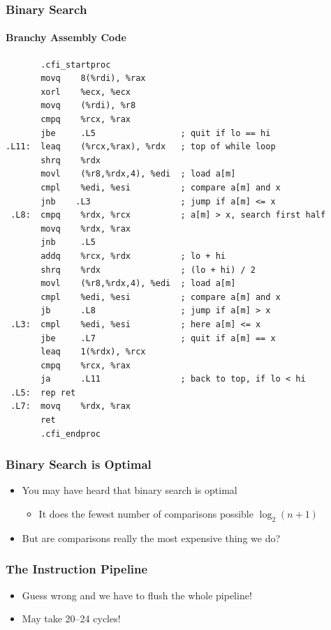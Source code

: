 \documentclass[xcolor=dvipsnames]{beamer}
\newcommand{\mi}[1]{\multiinclude[<+>][start=1,format=pdf]{#1}}
\begin{document}
\begin{frame}[fragile]
  \frametitle{Binary Search}
  \framesubtitle{Branchy Assembly Code}

\tiny
\begin{verbatim}
       .cfi_startproc
       movq    8(%rdi), %rax
       xorl    %ecx, %ecx
       movq    (%rdi), %r8
       cmpq    %rcx, %rax
       jbe     .L5                 ; quit if lo == hi
.L11:  leaq    (%rcx,%rax), %rdx   ; top of while loop
       shrq    %rdx
       movl    (%r8,%rdx,4), %edi  ; load a[m]
       cmpl    %edi, %esi          ; compare a[m] and x
       jnb    .L3                  ; jump if a[m] <= x
 .L8:  cmpq    %rdx, %rcx          ; a[m] > x, search first half
       movq    %rdx, %rax
       jnb     .L5
       addq    %rcx, %rdx          ; lo + hi
       shrq    %rdx                ; (lo + hi) / 2
       movl    (%r8,%rdx,4), %edi  ; load a[m]
       cmpl    %edi, %esi          ; compare a[m] and x
       jb      .L8                 ; jump if a[m] > x
 .L3:  cmpl    %edi, %esi          ; here a[m] <= x
       jbe     .L7                 ; quit if a[m] == x
       leaq    1(%rdx), %rcx
       cmpq    %rcx, %rax
       ja      .L11                ; back to top, if lo < hi
 .L5:  rep ret
 .L7:  movq    %rdx, %rax
       ret
       .cfi_endproc
\end{verbatim}

\end{frame}

\begin{frame}
   \frametitle{Binary Search is Optimal}

   \begin{itemize}[<+->]
     \item You may have heard that binary search is optimal
     \begin{itemize}
        \item It does the fewest number of comparisons possible $\log_2(n+1)$
     \end{itemize}
     \item But are comparisons really the most expensive thing we do?
   \end{itemize}
\end{frame}

\begin{frame}
   \frametitle{The Instruction Pipeline}

   \begin{center}
      \mi{figs/pipeline}
   \end{center}
   \vspace{-1em}
   \begin{itemize}
     \item<3->Guess wrong and we have to flush the whole pipeline!
     \item<4->May take 20--24 cycles!
   \end{itemize}
\end{frame}
\end{document}
